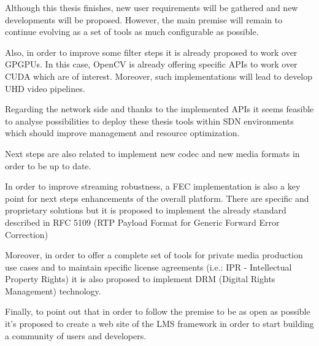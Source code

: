 Although this thesis finishes, new user requirements will be gathered and new developments will be proposed. However, the main premise will remain to continue evolving as a set of tools as much configurable as possible.

Also, in order to improve some filter steps it is already proposed to work over GPGPUs. In this case, OpenCV is already offering specific APIs to work over CUDA which are of interest. Moreover, such implementations will lead to develop UHD video pipelines.

Regarding the network side and thanks to the implemented APIs it seems feasible to analyse possibilities to deploy these thesis tools within SDN environments which should improve management and resource optimization.

Next steps are also related to implement new codec and new media formats in order to be up to date. 

In order to improve streaming robustness, a FEC implementation is also a key point for next steps enhancements of the overall platform. There are specific and proprietary solutions but it is proposed to implement the already standard described in RFC 5109 (RTP Payload Format for Generic Forward Error Correction)

Moreover, in order to offer a complete set of tools for private media production use cases and to maintain specific license agreements (i.e.: IPR - Intellectual Property Rights) it is also proposed to implement DRM (Digital Rights Management) technology.

Finally, to point out that in order to follow the premise to be as open as possible it's proposed to create a web site of the LMS framework in order to start building a community of users and developers.